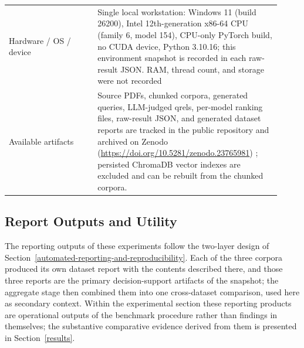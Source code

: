 \begin{table}[htbp]
\begin{tabular}{@{}>{\raggedright\arraybackslash}p{0.30\linewidth}>{\raggedright\arraybackslash}p{0.62\linewidth}@{}}
Hardware / OS / device & Single local workstation: Windows 11 (build 26200), Intel 12th-generation x86-64 CPU (family 6, model 154), CPU-only PyTorch build, no CUDA device, Python 3.10.16; this environment snapshot is recorded in each raw-result JSON. RAM, thread count, and storage were not recorded \\
Available artifacts & Source PDFs, chunked corpora, generated queries, LLM-judged qrels, per-model ranking files, raw-result JSON, and generated dataset reports are tracked in the public repository \citep{GitHub_RagRetrievalBench} and archived on Zenodo (\url{https://doi.org/10.5281/zenodo.23765981}) \citep{Zenodo_RagRetrievalBench}; persisted ChromaDB vector indexes are excluded and can be rebuilt from the chunked corpora. \\
\bottomrule
\end{tabular}
\end{table}

\subsection{Report Outputs and Utility}\label{report-outputs-and-utility}

The reporting outputs of these experiments follow the two-layer design of Section~\ref{automated-reporting-and-reproducibility}. Each of the three corpora produced its own dataset report with the contents described there, and those three reports are the primary decision-support artifacts of the snapshot; the aggregate stage then combined them into one cross-dataset comparison, used here as secondary context. Within the experimental section these reporting products are operational outputs of the benchmark procedure rather than findings in themselves; the substantive comparative evidence derived from them is presented in Section~\ref{results}.

